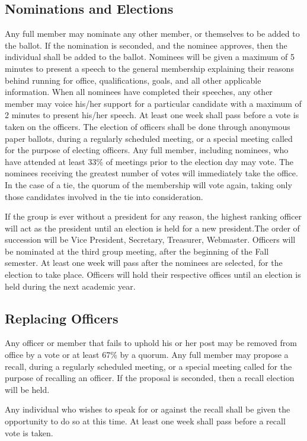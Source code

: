 \documentclass{article}
\begin{document}
\subsection{Nominations and Elections}
Any full member may nominate any other member, or themselves to be
added to the ballot.  If the nomination is seconded, and the nominee
approves, then the individual shall be added to the ballot. Nominees
will be given a maximum of 5 minutes to present a speech to the general
membership explaining their reasons behind running for office,
qualifications, goals, and all other applicable information. When all
nominees have completed their speeches, any other member may voice
his/her support for a particular candidate with a maximum of 2 minutes
to present his/her speech.  At least one week shall pass before a vote
is taken on the officers. The election of officers shall be done through
anonymous paper ballots, during a regularly scheduled meeting, or a
special meeting called for the purpose of electing officers.  Any full
member, including nominees, who have attended at least 33\% of meetings
prior to the election day may vote. The nominees receiving the greatest
number of votes will immediately take the office. In the case of a tie,
the quorum of the membership will vote again, taking only those candidates
involved in the tie into consideration.

If the group is ever without a president for any reason, the highest
ranking officer will act as the president until an election is held
for a new president.The order of succession will be Vice President,
Secretary, Treasurer, Webmaster. Officers will be nominated at the
third group meeting, after the beginning of the Fall semester. At
least one week will pass after the nominees are selected, for the
election to take place. Officers will hold their respective offices
until an election is held during the next academic year.

\subsection{Replacing Officers}
Any officer or member that fails to uphold his or her post may be
removed from office by a vote or at least 67\% by a quorum. Any
full member may propose a recall, during a regularly scheduled meeting,
or a special meeting called for the purpose of recalling an officer. 
If the proposal is seconded, then a recall election will be held.

Any individual who wishes to speak for or against the recall shall be
given the opportunity to do so at this time. At least one week shall
pass before a recall vote is taken.
\end{document}
